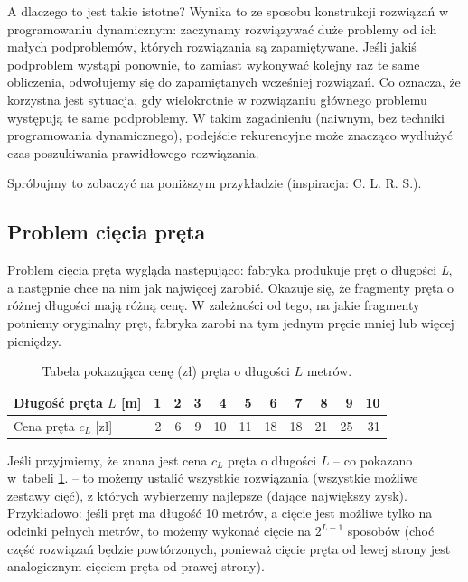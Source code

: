 \documentclass[twoside]{article}
\begin{document}
A dlaczego to jest takie istotne?
Wynika to ze sposobu konstrukcji rozwiązań w programowaniu dynamicznym: zaczynamy rozwiązywać
duże problemy od ich małych podproblemów, których rozwiązania są zapamiętywane.
Jeśli jakiś podproblem wystąpi ponownie, to zamiast wykonywać kolejny raz te same obliczenia, 
odwołujemy się do zapamiętanych wcześniej rozwiązań.
Co oznacza, że korzystna jest sytuacja, gdy wielokrotnie w rozwiązaniu głównego problemu występują
te same podproblemy.
W takim zagadnieniu (naiwnym, bez techniki programowania dynamicznego), podejście
rekurencyjne może znacząco wydłużyć czas poszukiwania prawidłowego rozwiązania.

Spróbujmy to zobaczyć na poniższym przykładzie (inspiracja: C. L. R. S.).


\subsection{Problem cięcia pręta}

Problem cięcia pręta wygląda następująco: fabryka produkuje pręt o długości \textit{L}, a następnie
chce na nim jak najwięcej zarobić.
Okazuje się, że fragmenty pręta o różnej długości mają różną cenę.
W zależności od tego, na jakie fragmenty potniemy oryginalny pręt, fabryka zarobi na tym jednym
pręcie mniej lub więcej pieniędzy.

\begin{table}[h!]
\centering
\begin{tabular}{|l|r|r|r|r|r|r|r|r|r|r|}
\hline
Długość pręta $L$ [m] & 1 & 2 & 3 & 4  & 5  & 6  & 7  & 8  & 9  & 10 \\ \hline
Cena pręta $c_L$ [zł] & 2 & 6 & 9 & 10 & 11 & 18 & 18 & 21 & 25 & 31 \\ \hline
\end{tabular}
\caption{Tabela pokazująca cenę (zł) pręta o długości $L$ metrów.}
\label{table:rod_price}
\end{table}

Jeśli przyjmiemy, że znana jest cena $c_L$ pręta o długości $L$ -- co pokazano w~tabeli 
\ref{table:rod_price}. -- to możemy ustalić wszystkie rozwiązania (wszystkie możliwe zestawy cięć),
z których wybierzemy najlepsze (dające największy zysk).
Przykładowo: jeśli pręt ma długość 10 metrów, a cięcie jest możliwe tylko na odcinki pełnych metrów,
to możemy wykonać cięcie na $2^{L-1}$ sposobów (choć część rozwiązań będzie powtórzonych, ponieważ cięcie pręta od lewej strony jest analogicznym cięciem pręta od prawej strony).
\end{document}
